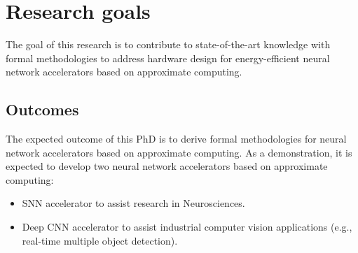 \section{Research goals}
The goal of this research is to contribute to state-of-the-art knowledge with formal methodologies to address hardware design for energy-efficient neural network accelerators based on approximate computing.

\subsection{Outcomes}
The expected outcome of this PhD is to derive formal methodologies for neural network accelerators based on approximate computing. As a demonstration, it is expected to develop two neural network accelerators based on approximate computing:

\begin{itemize}
\item SNN accelerator to assist research in Neurosciences.
\item Deep CNN accelerator to assist industrial computer vision applications (e.g., real-time multiple object detection).
\end{itemize}